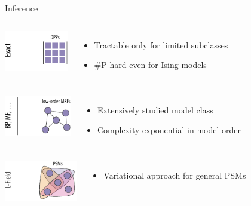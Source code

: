 \documentclass[mathserif]{beamer}
\begin{document}
\begin{frame}{Inference}
\vspace{0.5em}

\begin{minipage}{\textwidth}
\begin{columns}[c]
\includegraphics[height=0.7in]{figures/inf_dpp.pdf}
\begin{itemize}
\item Tractable only for limited subclasses
\vspace{0.3em}
\item \#P-hard even for Ising models
\end{itemize}
\end{columns}
\end{minipage}

\vspace{2em}
\begin{minipage}{\textwidth}
\begin{columns}[c]
\includegraphics[height=0.7in]{figures/inf_mrf.pdf}
\begin{itemize}
\item Extensively studied model class
\vspace{0.3em}
\item Complexity exponential in model order
\end{itemize}
\end{columns}
\end{minipage}

\vspace{2em}
\begin{minipage}{\textwidth}
\begin{columns}[c]
\includegraphics[height=0.7in]{figures/inf_psm.pdf}
\begin{itemize}
\item Variational approach for general PSMs\\
\end{itemize}
\end{columns}
\end{minipage}
\end{frame}
\end{document}
